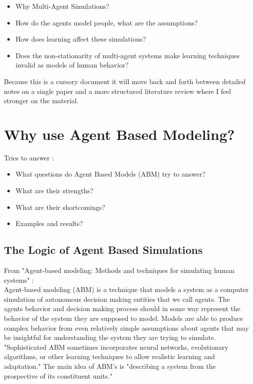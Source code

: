 \documentclass[12pt,twoside]{reedthesis}
\begin{document}
	\begin{itemize}
		\item Why Multi-Agent Simulations?
		\item How do the agents model people, what are the assumptions?
		\item How does learning affect these simulations?
		\item Does the non-stationarity of multi-agent systems make learning techniques invalid as models of human behavior?
	\end{itemize}
	
	Because this is a cursory document it will move back and forth between detailed notes on a single paper and a more structured literature review where I feel stronger on the material.
	
\section{Why use Agent Based Modeling?}
	Tries to answer :
	\begin{itemize}
		\item What questions do Agent Based Models (ABM) try to answer?
		\item What are their strengths?
		\item What are their shortcomings?
		\item Examples and results?
	\end{itemize}

\subsection{The Logic of Agent Based Simulations}

From "Agent-based modeling: Methods and techniques for simulating human systems" \cite{Bonabeau2002}: \\

Agent-based modeling (ABM) is a technique that models a system as a computer simulation of autonomous decision making entities that we call agents. The agents behavior and decision making process should in some way represent the behavior of the system they are supposed to model. Models are able to produce complex behavior from even relatively simple assumptions about agents that may be insightful for understanding the system they are trying to simulate. "Sophisticated ABM sometimes incorporates neural networks, evolutionary algorithms, or other learning techniques to allow realistic learning and adaptation." The main idea of ABM's is "describing a system from the prospective of its constituent units." 
\end{document}
